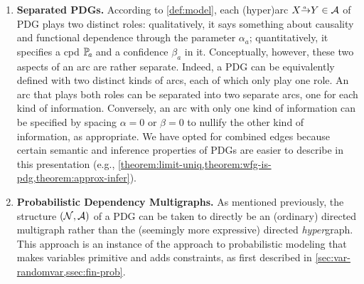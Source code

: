 \begin{enumerate}[wide, label={\textbf{PDG Variant \arabic{*}:}}]
	\item
	\textbf{Separated PDGs.}
	According to \cref{def:model}, each
	(hyper)arc $\ed aXY \in \Ar$ of PDG plays two distinct roles: 
	qualitatively, it says something about causality and functional dependence through the parameter $\alpha_a$;
	quantitatively, it specifies a cpd $\p_a$ and a confidence $\beta_a$ in it. 
	Conceptually, however, these two aspects of an arc are rather separate. 
	Indeed, a PDG can be equivalently defined with two distinct kinds of arcs, each of which only play one role. An arc that plays both roles can be separated into two separate arcs, one for each kind of information. Conversely, an arc with only one kind of information can be specified by spacing $\alpha = 0$ or $\beta = 0$ to nullify the other kind of information, as appropriate. 
	We have opted for combined edges because certain semantic and inference properties of PDGs are easier to describe in this presentation (e.g., \cref{theorem:limit-uniq,theorem:wfg-is-pdg,theorem:approx-infer}).


    \item 
	\textbf{Probabilistic Dependency Multigraphs. }
	As mentioned previously,
    the structure $(\mathcal N, \mathcal A)$ of a PDG can be taken to directly be an (ordinary) directed multigraph rather than the (seemingly more expressive) directed \emph{hyper}graph. 
	This approach is an instance of the
    approach to probabilistic modeling that makes variables primitive and adds constraints,
    as first described in \cref{sec:var-randomvar,ssec:fin-prob}.


\end{enumerate}
